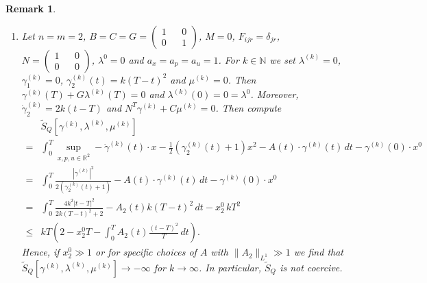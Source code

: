 \documentclass[11pt]{article}
\newcommand{\R}{\mathbb R}
\newcommand{\N}{\mathbb N}
\newtheorem{remark}{Remark}[section]
\begin{document}
\begin{remark}
\begin{enumerate}
\item  Let $n=m=2$, $B=C=G= \begin{pmatrix} 1&& 0 \\ 0 && 1 \end{pmatrix}$, $M=0$, $F_{ijr} = \delta_{jr}$, $N = \begin{pmatrix} 1 && 0 \\ 0 && 0\end{pmatrix}$, $\lambda^0 = 0$ and $a_x=a_p=a_u=1$. 
 For $k \in \N$ we set $\lambda^{(k)} = 0$, $\gamma^{(k)}_1 = 0$, $\gamma^{(k)}_2(t) = k( T-t)^2$ and $\mu^{(k)} = 0$.
    Then $\gamma^{(k)}(T) + G \lambda^{(k)}(T) = 0$ and $\lambda^{(k)}(0) = 0 = \lambda^0$. 
    Moreover, $\dot{\gamma}^{(k)}_2 = 2 k (t-T)$ and $N^T\gamma^{(k)} + C \mu^{(k)} = 0$.
    Then compute 
    \begin{align*}
&\tilde{S}_Q[\gamma^{(k)},\lambda^{(k)},\mu^{(k)}] \\ 
= & \int_0^T \sup_{x,p,u\in \R^2} - \dot{\gamma}^{(k)}(t) \cdot x -\frac12(\gamma^{(k)}_2(t) + 1) x^2  - A(t)\cdot \gamma^{(k)}(t) \, dt - \gamma^{(k)}(0)\cdot x^0 \\
= &\int_0^T \frac{\left| \dot{\gamma}^{(k)}  \right|^2}{2(\gamma^{(k)}_2(t) + 1)}  - A(t) \cdot \gamma^{(k)}(t) \, dt - \gamma^{(k)}(0)\cdot x^0 \\
=& \int_0^T \frac{4k^2 |t-T|^2}{2 k (T-t)^2 + 2}  - A_2(t) k (T-t)^2 \, dt - x^0_2 \, k T^2 \\
\leq& kT \left(2 - x^0_2T -  \int_0^T A_2(t) \frac{(t-T)^2}T \, dt\right).
    \end{align*}
Hence, if $x^0_2 \gg 1$ or for specific choices of $A$ with $\|A_2\|_{L^1} \gg 1$ we find that $\tilde{S}_Q[\gamma^{(k)},\lambda^{(k)},\mu^{(k)}] \to -\infty$ for $k\to \infty$. In particular, $\tilde{S}_Q$ is not coercive.


\end{enumerate}
\end{remark}
\end{document}
